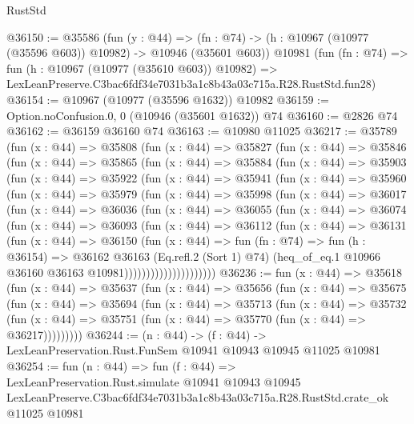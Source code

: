 \begin{lexlean}{RustStd}
\begin{coremodule}
@36150 := @35586
    (fun (y : @44) =>
    (fn : @74) -> (h : @10967 (@10977 (@35596 @603)) @10982) -> @10946 (@35601 @603))
    @10981
    (fun (fn : @74) =>
    fun (h : @10967 (@10977 (@35610 @603)) @10982) =>
    LexLeanPreserve.C3bac6fdf34e7031b3a1c8b43a03c715a.R28.RustStd.fun28)
@36154 := @10967 (@10977 (@35596 @1632)) @10982
@36159 := Option.noConfusion.{0, 0} (@10946 (@35601 @1632)) @74
@36160 := @2826 @74
@36162 := @36159 @36160 @74
@36163 := @10980 @11025
@36217 := @35789
    (fun (x : @44) =>
    @35808
      (fun (x : @44) =>
      @35827
        (fun (x : @44) =>
        @35846
          (fun (x : @44) =>
          @35865
            (fun (x : @44) =>
            @35884
              (fun (x : @44) =>
              @35903
                (fun (x : @44) =>
                @35922
                  (fun (x : @44) =>
                  @35941
                    (fun (x : @44) =>
                    @35960
                      (fun (x : @44) =>
                      @35979
                        (fun (x : @44) =>
                        @35998
                          (fun (x : @44) =>
                          @36017
                            (fun (x : @44) =>
                            @36036
                              (fun (x : @44) =>
                              @36055
                                (fun (x : @44) =>
                                @36074
                                  (fun (x : @44) =>
                                  @36093
                                    (fun (x : @44) =>
                                    @36112
                                      (fun (x : @44) =>
                                      @36131
                                        (fun (x : @44) =>
                                        @36150
                                          (fun (x : @44) =>
                                          fun (fn : @74) =>
                                          fun (h : @36154) =>
                                          @36162
                                            @36163
                                            (Eq.refl.{2} (Sort 1) @74)
                                            (heq_of_eq.{1}
                                              @10966
                                              @36160
                                              @36163
                                              @10981)))))))))))))))))))))
@36236 := fun (x : @44) =>
  @35618
    (fun (x : @44) =>
    @35637
      (fun (x : @44) =>
      @35656
        (fun (x : @44) =>
        @35675
          (fun (x : @44) =>
          @35694
            (fun (x : @44) =>
            @35713
              (fun (x : @44) =>
              @35732
                (fun (x : @44) => @35751 (fun (x : @44) => @35770 (fun (x : @44) => @36217)))))))))
@36244 := (n : @44) ->
  (f : @44) -> LexLeanPreservation.Rust.FunSem @10941 @10943 @10945 @11025 @10981
@36254 := fun (n : @44) =>
  fun (f : @44) =>
  LexLeanPreservation.Rust.simulate
    @10941
    @10943
    @10945
    LexLeanPreserve.C3bac6fdf34e7031b3a1c8b43a03c715a.R28.RustStd.crate_ok
    @11025
    @10981
\end{coremodule}
\end{lexlean}
